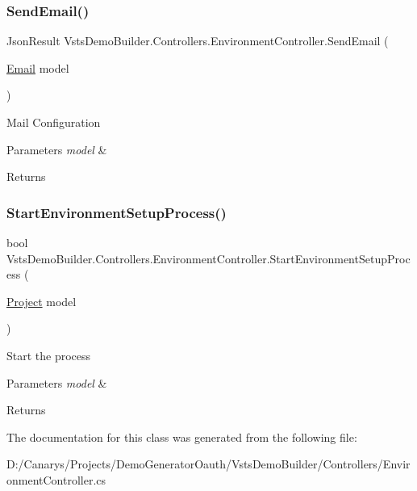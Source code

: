 \subsubsection{\texorpdfstring{Send\+Email()}{SendEmail()}}
{\footnotesize\ttfamily Json\+Result Vsts\+Demo\+Builder.\+Controllers.\+Environment\+Controller.\+Send\+Email (\begin{DoxyParamCaption}\item[{\mbox{\hyperlink{class_vsts_demo_builder_1_1_models_1_1_email}{Email}}}]{model }\end{DoxyParamCaption})}



Mail Configuration 


\begin{DoxyParams}{Parameters}
{\em model} & \\
\hline
\end{DoxyParams}
\begin{DoxyReturn}{Returns}

\end{DoxyReturn}
\mbox{\label{class_vsts_demo_builder_1_1_controllers_1_1_environment_controller_ad6b69ff448fc483cb517729d55c55dcc}} 
\subsubsection{\texorpdfstring{Start\+Environment\+Setup\+Process()}{StartEnvironmentSetupProcess()}}
{\footnotesize\ttfamily bool Vsts\+Demo\+Builder.\+Controllers.\+Environment\+Controller.\+Start\+Environment\+Setup\+Process (\begin{DoxyParamCaption}\item[{\mbox{\hyperlink{class_vsts_demo_builder_1_1_models_1_1_project}{Project}}}]{model }\end{DoxyParamCaption})}



Start the process 


\begin{DoxyParams}{Parameters}
{\em model} & \\
\hline
\end{DoxyParams}
\begin{DoxyReturn}{Returns}

\end{DoxyReturn}


The documentation for this class was generated from the following file\+:\begin{DoxyCompactItemize}
\item 
D\+:/\+Canarys/\+Projects/\+Demo\+Generator\+Oauth/\+Vsts\+Demo\+Builder/\+Controllers/Environment\+Controller.\+cs\end{DoxyCompactItemize}
